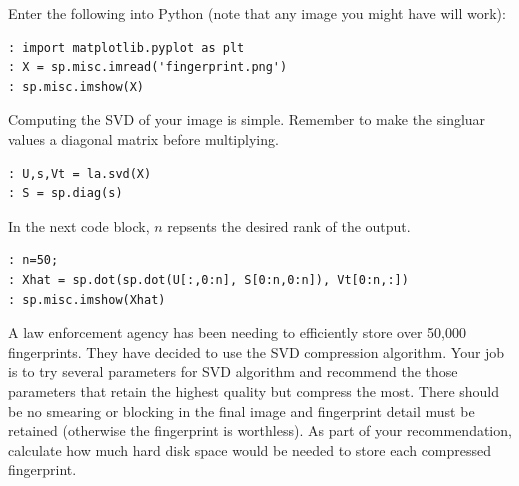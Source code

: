 \begin{python}
Enter the following into Python (note that any image you might have will work):
\begin{lstlisting}
: import matplotlib.pyplot as plt
: X = sp.misc.imread('fingerprint.png')
: sp.misc.imshow(X)
\end{lstlisting}
Computing the SVD of your image is simple.  Remember to make the singluar values a diagonal matrix before multiplying.
\begin{lstlisting}
: U,s,Vt = la.svd(X)
: S = sp.diag(s)
\end{lstlisting}
In the next code block, $n$ repsents the desired rank of the output.
\begin{lstlisting}
: n=50;
: Xhat = sp.dot(sp.dot(U[:,0:n], S[0:n,0:n]), Vt[0:n,:])
: sp.misc.imshow(Xhat)
\end{lstlisting}

\begin{problem}
A law enforcement agency has been needing to efficiently store over 50,000 fingerprints.  They have decided to use the SVD compression algorithm.  Your job is to try several parameters for SVD algorithm and recommend the those parameters that retain the highest quality but compress the most.  There should be no smearing or blocking in the final image and fingerprint detail must be retained (otherwise the fingerprint is worthless).  As part of your recommendation, calculate how much hard disk space would be needed to store each compressed fingerprint.
\end{problem}
\end{python}
